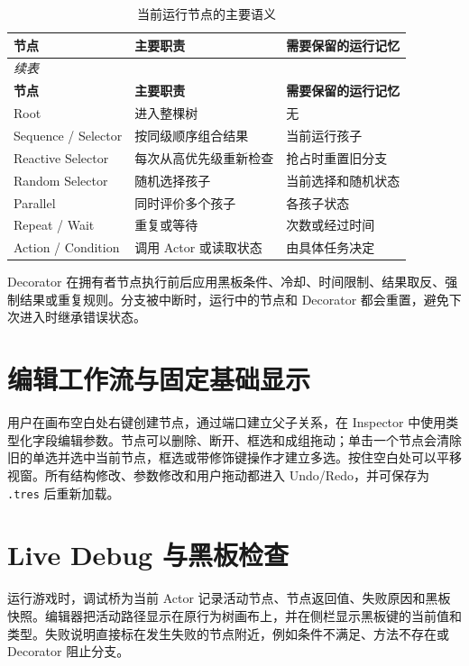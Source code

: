 \documentclass[11pt,a4paper,oneside,extrafontsizes]{memoir}
\begin{document}
\begin{center}
\small
\begin{longtable}{@{}p{} p{} p{}@{}}
\caption{当前运行节点的主要语义}\label{tab:auto-5}\\
\toprule
\textbf{节点} & \textbf{主要职责} & \textbf{需要保留的运行记忆} \\
\midrule
\endfirsthead
\multicolumn{3}{l}{\small\itshape 续表}\\
\toprule
\textbf{节点} & \textbf{主要职责} & \textbf{需要保留的运行记忆} \\
\midrule
\endhead
Root & 进入整棵树 & 无 \\
Sequence / Selector & 按同级顺序组合结果 & 当前运行孩子 \\
Reactive Selector & 每次从高优先级重新检查 & 抢占时重置旧分支 \\
Random Selector & 随机选择孩子 & 当前选择和随机状态 \\
Parallel & 同时评价多个孩子 & 各孩子状态 \\
Repeat / Wait & 重复或等待 & 次数或经过时间 \\
Action / Condition & 调用 Actor 或读取状态 & 由具体任务决定 \\
\bottomrule
\end{longtable}
\end{center}

Decorator 在拥有者节点执行前后应用黑板条件、冷却、时间限制、结果取反、强制结果或重复规则。分支被中断时，运行中的节点和 Decorator 都会重置，避免下次进入时继承错误状态。

\section{编辑工作流与固定基础显示}

用户在画布空白处右键创建节点，通过端口建立父子关系，在 Inspector 中使用类型化字段编辑参数。节点可以删除、断开、框选和成组拖动；单击一个节点会清除旧的单选并选中当前节点，框选或带修饰键操作才建立多选。按住空白处可以平移视窗。所有结构修改、参数修改和用户拖动都进入 Undo/Redo，并可保存为 \texttt{.tres} 后重新加载。

\section{Live Debug 与黑板检查}

运行游戏时，调试桥为当前 Actor 记录活动节点、节点返回值、失败原因和黑板快照。编辑器把活动路径显示在原行为树画布上，并在侧栏显示黑板键的当前值和类型。失败说明直接标在发生失败的节点附近，例如条件不满足、方法不存在或 Decorator 阻止分支。
\end{document}
